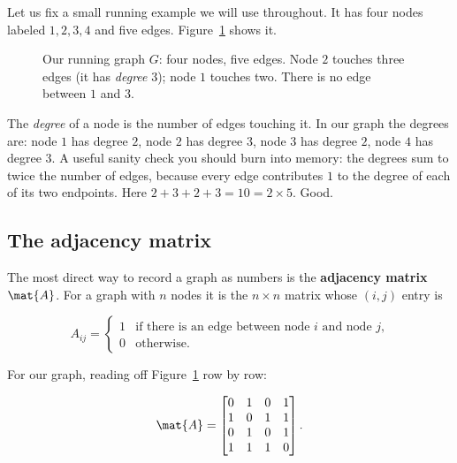 Let us fix a small running example we will use throughout. It has four nodes labeled
$1,2,3,4$ and five edges. Figure~\ref{ch35:fig-graph4} shows it.

\begin{figure}[H]
\centering
{}
\caption{Our running graph $G$: four nodes, five edges. Node $2$ touches three edges
(it has \emph{degree} $3$); node $1$ touches two. There is no edge between $1$ and $3$.}
\label{ch35:fig-graph4}
\end{figure}

The \emph{degree} of a node is the number of edges touching it. In our graph the degrees
are: node $1$ has degree $2$, node $2$ has degree $3$, node $3$ has degree $2$, node $4$
has degree $3$. A useful sanity check you should burn into memory: the degrees sum to
twice the number of edges, because every edge contributes $1$ to the degree of each of its
two endpoints. Here $2+3+2+3 = 10 = 2 \times 5$. Good.

\subsection{The adjacency matrix}
\label{ch35:adjacency}

The most direct way to record a graph as numbers is the \textbf{adjacency matrix} $\mat{A}$.
For a graph with $n$ nodes it is the $n \times n$ matrix whose $(i,j)$ entry is

\[
A_{ij} =
\begin{cases}
1 & \text{if there is an edge between node $i$ and node $j$,}\\
0 & \text{otherwise.}
\end{cases}
\]

For our graph, reading off Figure~\ref{ch35:fig-graph4} row by row:

\[
\mat{A} =
\begin{bmatrix}
0 & 1 & 0 & 1\\
1 & 0 & 1 & 1\\
0 & 1 & 0 & 1\\
1 & 1 & 1 & 0
\end{bmatrix}.
\]

